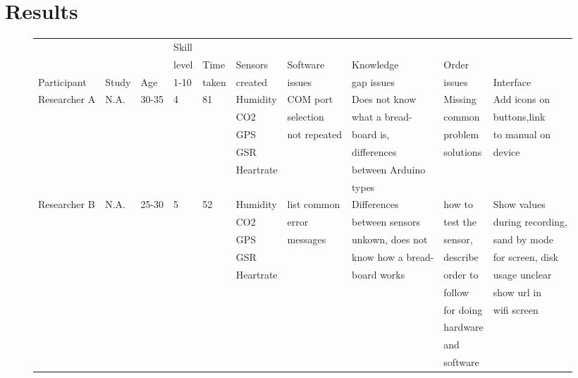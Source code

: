 \documentclass[conference]{IEEEtran}
\begin{document}
\section{Results}
		\begin{figure*}[ht]
			\centering
			\begin{tabular}{ | l | l | l | l | l | l | l | l | l | l | }
				\hline
							& 				& 		& Skill	& 		& 			& 				& 					& 			& 				\\ 
							& 				& 		& level	& Time	& Sensors	& Software		& Knowledge			& Order 	& 				\\ 
			Participant		& Study			& Age	& 1-10	& taken	& created	& issues 		& gap issues		& issues	& Interface		\\ \hline \hline
			
			
			Researcher A	& N.A.			& 30-35 & 4		& 81	& Humidity	& COM port 		& Does not know		& Missing	& Add icons on	\\ 
							& 				& 		& 		& 		& CO2		& selection 	& what a bread-		& common	& buttons,link	\\ 
							& 				& 		& 		& 		& GPS		& not repeated	& board is, 		& problem	& to manual on	\\
							& 				& 		& 		& 		& GSR		& 				& differences 		& solutions	& device		\\
							& 				& 		& 		& 		& Heartrate	& 				& between Arduino	& 			& 				\\
							&				&		&		&		&			&				& types				&			&				\\ \hline
							
			Researcher B	& N.A.			& 25-30 & 5 	& 52	& Humidity	& list common	& Differences 		& how to	& Show values	\\ 
							& 				& 		& 		& 		& CO2		& error 		& between sensors 	& test the	& during recording,\\
							& 				& 		& 		& 		& GPS		& messages		& unkown, does not 	& sensor,	& sand by mode	\\
							& 				& 		& 		& 		& GSR		& 				& know how a bread-	& describe	& for screen, disk	\\
							& 				& 		& 		& 		& Heartrate	& 				& board works		& order to	& usage unclear	\\
							&				&		&		&		&			&				&					& follow	& show url in 	\\
							&				&		&		&		&			&				&					& for doing	& wifi screen	\\
							&				&		&		&		&			&				&					& hardware	&				\\ 
							&				&		&		&		&			&				&					& and		&				\\ 
							&				&		&		&		&			&				&					& software	&				\\ \hline


\end{tabular}
\end{figure*}
\end{document}
